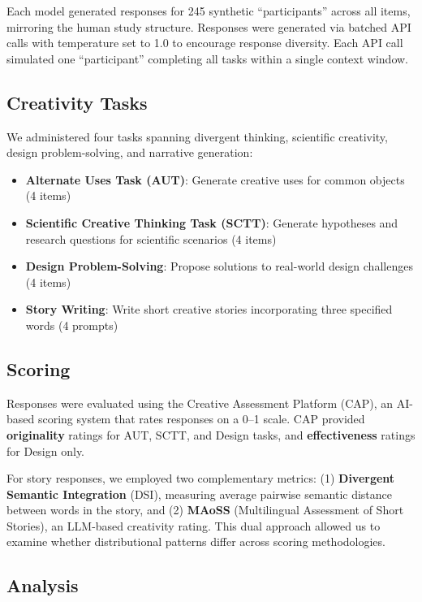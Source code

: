 \documentclass[11pt,twocolumn]{article}
\begin{document}
Each model generated responses for 245 synthetic ``participants'' across all items, mirroring the human study structure. Responses were generated via batched API calls with temperature set to 1.0 to encourage response diversity. Each API call simulated one ``participant'' completing all tasks within a single context window.

\subsection{Creativity Tasks}

We administered four tasks spanning divergent thinking, scientific creativity, design problem-solving, and narrative generation:
\begin{itemize}
    \item \textbf{Alternate Uses Task (AUT)}: Generate creative uses for common objects (4 items)
    \item \textbf{Scientific Creative Thinking Task (SCTT)}: Generate hypotheses and research questions for scientific scenarios (4 items)
    \item \textbf{Design Problem-Solving}: Propose solutions to real-world design challenges (4 items)
    \item \textbf{Story Writing}: Write short creative stories incorporating three specified words (4 prompts)
\end{itemize}

\subsection{Scoring}

Responses were evaluated using the Creative Assessment Platform (CAP), an AI-based scoring system that rates responses on a 0--1 scale. CAP provided \textbf{originality} ratings for AUT, SCTT, and Design tasks, and \textbf{effectiveness} ratings for Design only.

For story responses, we employed two complementary metrics: (1) \textbf{Divergent Semantic Integration} (DSI), measuring average pairwise semantic distance between words in the story, and (2) \textbf{MAoSS} (Multilingual Assessment of Short Stories), an LLM-based creativity rating. This dual approach allowed us to examine whether distributional patterns differ across scoring methodologies.

\subsection{Analysis}
\end{document}
